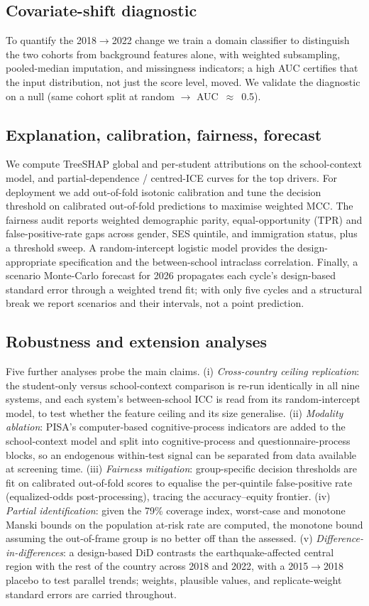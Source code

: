 \subsection{Covariate-shift diagnostic}
To quantify the 2018$\rightarrow$2022 change we train a domain classifier to
distinguish the two cohorts from background features alone, with weighted subsampling,
pooled-median imputation, and missingness indicators; a high AUC certifies that the
input distribution, not just the score level, moved. We validate the diagnostic
on a null (same cohort split at random $\rightarrow$ AUC~$\approx$~0.5).

\subsection{Explanation, calibration, fairness, forecast}
We compute TreeSHAP global and per-student attributions on the school-context model,
and partial-dependence / centred-ICE curves for the top drivers. For deployment we
add out-of-fold isotonic calibration and tune the decision threshold on calibrated
out-of-fold predictions to maximise weighted MCC. The fairness audit reports weighted
demographic parity, equal-opportunity (TPR) and false-positive-rate gaps across
gender, SES quintile, and immigration status, plus a threshold sweep. A random-intercept
logistic model provides the design-appropriate specification and the between-school
intraclass correlation. Finally, a scenario Monte-Carlo forecast for 2026 propagates
each cycle's design-based standard error through a weighted trend fit; with only five
cycles and a structural break we report scenarios and their intervals, not a point
prediction.

\subsection{Robustness and extension analyses}
Five further analyses probe the main claims. (i) \emph{Cross-country ceiling
replication}: the student-only versus school-context comparison is re-run identically in
all nine systems, and each system's between-school ICC is read from its random-intercept
model, to test whether the feature ceiling and its size generalise. (ii) \emph{Modality
ablation}: PISA's computer-based cognitive-process indicators are added to the
school-context model and split into cognitive-process and questionnaire-process blocks,
so an endogenous within-test signal can be separated from data available at screening
time. (iii) \emph{Fairness mitigation}: group-specific decision thresholds are fit on
calibrated out-of-fold scores to equalise the per-quintile false-positive rate
(equalized-odds post-processing), tracing the accuracy--equity frontier. (iv)
\emph{Partial identification}: given the 79\% coverage index, worst-case and monotone
Manski bounds on the population at-risk rate are computed, the monotone bound assuming
the out-of-frame group is no better off than the assessed. (v) \emph{Difference-in-differences}:
a design-based DiD contrasts the earthquake-affected central region with the rest of the
country across 2018 and 2022, with a 2015$\rightarrow$2018 placebo to test parallel
trends; weights, plausible values, and replicate-weight standard errors are carried
throughout.

